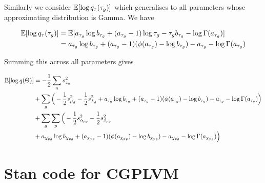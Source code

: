 Similarly we consider $\mathbb{E}[\log q_\tau(\tau_g)]$ which generalises to all parameters whose approximating distribution is Gamma. We have

\begin{equation}
\begin{aligned}
\mathbb{E}[\log q_\tau(\tau_g)] & 
= \mathbb{E}[a_{\tau_g} \log b_{\tau_g} + (a_{\tau_g} - 1) \log \tau_g - \tau_g b_{\tau_g} -\log \Gamma(a_{\tau_g})] \\
& = a_{\tau_g} \log b_{\tau_g} + (a_{\tau_g} - 1)(\phi(a_{\tau_g}) - \log b_{\tau_g}) - a_{\tau_g} - \log \Gamma(a_{\tau_g})
\end{aligned}
\end{equation}


Summing this across all parameters gives

\begin{equation}
\begin{aligned}
\mathbb{E}[\log q(\Theta)] &= -\frac{1}{2} \sum_n s_{z_n}^2 \\
& + \sum_g \Big(- \frac{1}{2} s_{\mu_g}^2 - \frac{1}{2} s_{\lambda_g}^2 +
a_{\tau_g} \log b_{\tau_g} + (a_{\tau_g} - 1)(\phi(a_{\tau_g}) - \log b_{\tau_g}) - a_{\tau_g} - \log \Gamma(a_{\tau_g}) \Big) \\
& + \sum_g \sum_p \Big(
-\frac{1}{2} s_{\alpha_{pg}}^2 - \frac{1}{2} s_{\beta_{pg}}^2 \\
& + a_{\chi_{pg}} \log b_{\chi_{pg}} + (a_{\chi_{pg}} - 1)(\phi(a_{\chi_{pg}}) - \log b_{\chi_{pg}}) - a_{\chi_{pg}} - \log \Gamma(a_{\chi_{pg}})\Big)
\end{aligned}
\end{equation}


\section{Stan code for CGPLVM}


